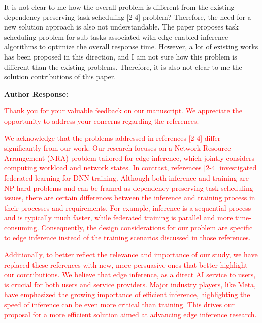 \documentclass{ar2rc}
\begin{document}
\begin{tcolorbox}[
   title={Reviewer 1: Comment 4},
   colback=gray!10,%
   colframe=black,%
   width=\linewidth,%
   arc=1mm, auto outer arc,
   boxrule=0.5pt,
]
It is not clear to me how the overall problem is different from the existing dependency preserving task scheduling [2-4] problem? Therefore, the need for a new solution approach is also not understandable. The paper proposes task scheduling problem for sub-tasks associated with edge enabled inference algorithms to optimize the overall response time. However, a lot of existing works has been proposed in this direction, and I am not sure how this problem is different than the existing problems. Therefore, it is also not clear to me the solution contributions of this paper.
\end{tcolorbox}
\textbf{Author Response:} 

\textcolor{red}{Thank you for your valuable feedback on our manuscript. We appreciate the opportunity to address your concerns regarding the references. }

\textcolor{red}{We acknowledge that the problems addressed in references [2-4] differ significantly from our work. Our research focuses on a Network Resource Arrangement (NRA) problem tailored for edge inference, which jointly considers computing workload and network states. In contrast, references [2-4] investigated federated learning for DNN training. Although both inference and training are NP-hard problems and can be framed as dependency-preserving task scheduling issues, there are certain differences between the inference and training process in their processes and requirements. For example, inference is a sequential process and is typically much faster, while federated training is parallel and more time-consuming. Consequently, the design considerations for our problem are specific to edge inference instead of the training scenarios discussed in those references.}

\textcolor{red}{Additionally, to better reflect the relevance and importance of our study, we have replaced these references with new, more persuasive ones that better highlight our contributions. We believe that edge inference, as a direct AI service to users, is crucial for both users and service providers. Major industry players, like Meta, have emphasized the growing importance of efficient inference, highlighting the speed of inference can be even more critical than training. This drives our proposal for a more efficient solution aimed at advancing edge inference research.}
\end{document}
